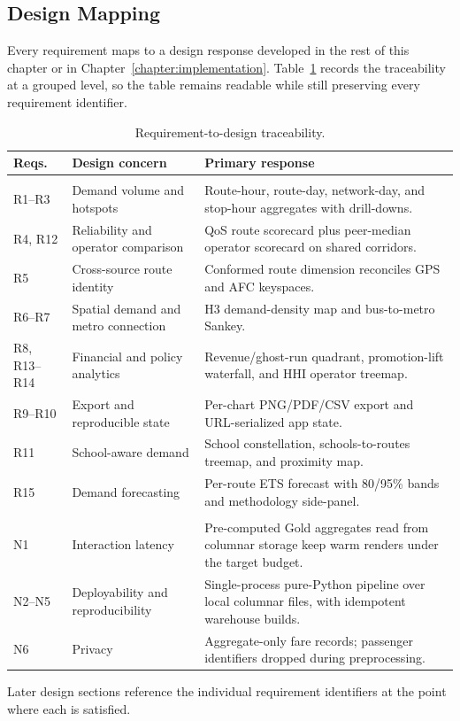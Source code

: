 \subsection{Design Mapping}
\label{sec:solution:problem:mapping}

Every requirement maps to a design response developed in the rest of this
chapter or in Chapter~\ref{chapter:implementation}.
Table~\ref{tab:problem:mapping} records the traceability at a grouped level,
so the table remains readable while still preserving every requirement
identifier.

\begin{table}[!htbp]
  \centering
  \caption{Requirement-to-design traceability.}
  \label{tab:problem:mapping}
  \small
  \renewcommand{\arraystretch}{1.2}
  \begin{tabularx}{\linewidth}{>{\raggedright\arraybackslash}p{1.65cm} >{\raggedright\arraybackslash}p{3.55cm} >{\raggedright\arraybackslash}X}
    \hline
    \textbf{Reqs.} & \textbf{Design concern} & \textbf{Primary response} \\
    \hline
    \multicolumn{3}{l}{\textit{Functional}} \\
    R1--R3 & Demand volume and hotspots & Route-hour, route-day, network-day, and stop-hour aggregates with drill-downs. \\
    R4, R12 & Reliability and operator comparison & QoS route scorecard plus peer-median operator scorecard on shared corridors. \\
    R5 & Cross-source route identity & Conformed route dimension reconciles GPS and AFC keyspaces. \\
    R6--R7 & Spatial demand and metro connection & H3 demand-density map and bus-to-metro Sankey. \\
    R8, R13--R14 & Financial and policy analytics & Revenue/ghost-run quadrant, promotion-lift waterfall, and HHI operator treemap. \\
    R9--R10 & Export and reproducible state & Per-chart PNG/PDF/CSV export and URL-serialized app state. \\
    R11 & School-aware demand & School constellation, schools-to-routes treemap, and proximity map. \\
    R15 & Demand forecasting & Per-route ETS forecast with 80/95\% bands and methodology side-panel. \\
    \hline
    \multicolumn{3}{l}{\textit{Non-functional}} \\
    N1 & Interaction latency & Pre-computed Gold aggregates read from columnar storage keep warm renders under the target budget. \\
    N2--N5 & Deployability and reproducibility & Single-process pure-Python pipeline over local columnar files, with idempotent warehouse builds. \\
    N6 & Privacy & Aggregate-only fare records; passenger identifiers dropped during preprocessing. \\
    \hline
  \end{tabularx}
\end{table}

Later design sections reference the individual requirement identifiers at the
point where each is satisfied.
